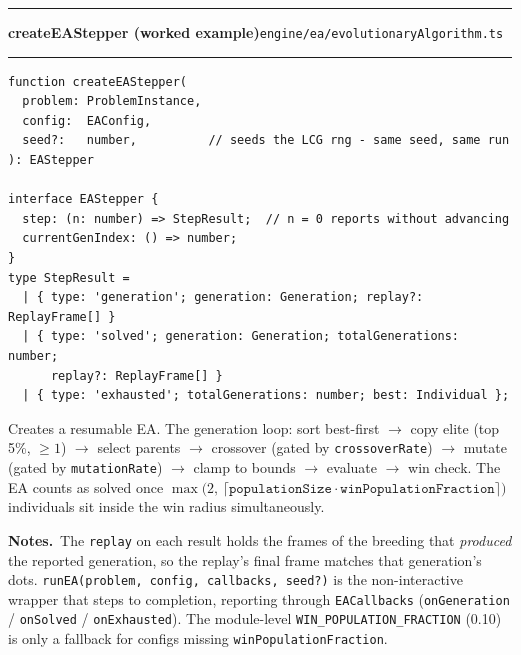 \documentclass[11pt,a4paper]{report}
\newcommand{\srcfile}[1]{\texttt{\small #1}}   %
\newcommand{\ts}[1]{\texttt{#1}}               %
\newenvironment{apientry}[2]{%
  \par\medskip\noindent
  \begin{minipage}{\textwidth}
  \hrule\vspace{0.6ex}
  {\large\ttfamily\bfseries #1}\hfill{\footnotesize\srcfile{#2}}
  \vspace{0.4ex}\hrule\medskip
}{%
  \end{minipage}\par\medskip
}
\newcommand{\apifield}[1]{\par\smallskip\noindent\textbf{#1.}\ }
\begin{document}
\begin{apientry}{createEAStepper (worked example)}{engine/ea/evolutionaryAlgorithm.ts}
\begin{lstlisting}
function createEAStepper(
  problem: ProblemInstance,
  config:  EAConfig,
  seed?:   number,          // seeds the LCG rng - same seed, same run
): EAStepper

interface EAStepper {
  step: (n: number) => StepResult;  // n = 0 reports without advancing
  currentGenIndex: () => number;
}
type StepResult =
  | { type: 'generation'; generation: Generation; replay?: ReplayFrame[] }
  | { type: 'solved'; generation: Generation; totalGenerations: number;
      replay?: ReplayFrame[] }
  | { type: 'exhausted'; totalGenerations: number; best: Individual };
\end{lstlisting}
Creates a resumable EA. The generation loop: sort best-first $\to$ copy
elite (top 5\%, $\geq 1$) $\to$ select parents $\to$ crossover (gated by
\ts{crossoverRate}) $\to$ mutate (gated by \ts{mutationRate}) $\to$ clamp
to bounds $\to$ evaluate $\to$ win check. The EA counts as solved once
$\max\bigl(2,\, \lceil \ts{populationSize} \cdot
\ts{winPopulationFraction} \rceil\bigr)$ individuals sit inside the win
radius simultaneously.
\apifield{Notes}The \ts{replay} on each result holds the frames of the
breeding that \emph{produced} the reported generation, so the replay's
final frame matches that generation's dots. \ts{runEA(problem, config,
callbacks, seed?)} is the non-interactive wrapper that steps to
completion, reporting through \ts{EACallbacks} (\ts{onGeneration} /
\ts{onSolved} / \ts{onExhausted}). The module-level
\ts{WIN\_POPULATION\_FRACTION} (0.10) is only a fallback for configs
missing \ts{winPopulationFraction}.
\end{apientry}
\end{document}
